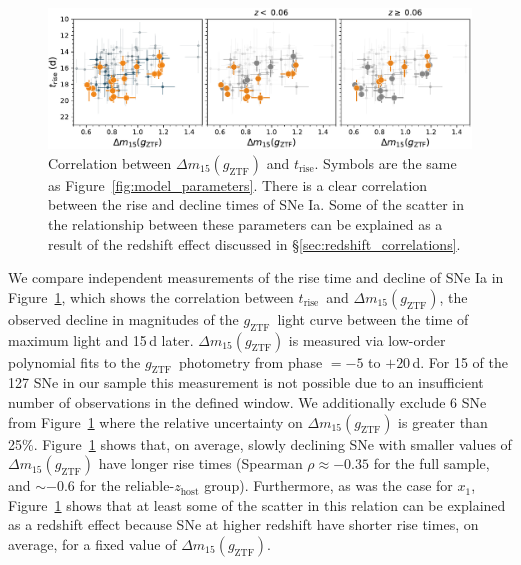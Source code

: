 \documentclass[twocolumn]{aastex63}
\newcommand{\gztf}{$g_\mathrm{ZTF}$}
\newcommand{\trise}{$t_\mathrm{rise}$}
\begin{document}
\begin{figure}
    \centering
    \includegraphics[width=6in]{./figures/dm15_rise.pdf}
    \caption{Correlation between $\Delta m_{15}(g_\mathrm{ZTF})$ and \trise.
    Symbols are the same as Figure~\ref{fig:model_parameters}. There is a clear
    correlation between the rise and decline times of SNe Ia. Some of the
    scatter in the relationship between these parameters can be explained as a
    result of the redshift effect discussed in
    \S\ref{sec:redshift_correlations}.}
    \label{fig:dm15}
\end{figure}

We compare independent measurements of the rise time and decline of SNe Ia in
Figure~\ref{fig:dm15}, which shows the correlation between \trise\ and $\Delta
m_{15}(g_\mathrm{ZTF})$, the observed decline in magnitudes of the \gztf\
light curve between the time of maximum light and 15\,d later. $\Delta
m_{15}(g_\mathrm{ZTF})$ is measured via low-order polynomial fits to the
\gztf\ photometry from phase $= -5$ to $+20$\,d. For 15 of the 127 SNe in our
sample this measurement is not possible due to an insufficient number of
observations in the defined window. We additionally exclude 6 SNe from
Figure~\ref{fig:dm15} where the relative uncertainty on $\Delta
m_{15}(g_\mathrm{ZTF})$ is greater than 25\%. Figure~\ref{fig:dm15} shows
that, on average, slowly declining SNe with smaller values of $\Delta
m_{15}(g_\mathrm{ZTF})$ have longer rise times (Spearman $\rho \approx -0.35$
for the full sample, and $\sim$$-0.6$ for the reliable-$z_\mathrm{host}$
group). Furthermore, as was the case for $x_1$, Figure~\ref{fig:dm15} shows
that at least some of the scatter in this relation can be explained as a
redshift effect because SNe at higher redshift have shorter rise times, on
average, for a fixed value of $\Delta m_{15}(g_\mathrm{ZTF})$.
\end{document}
